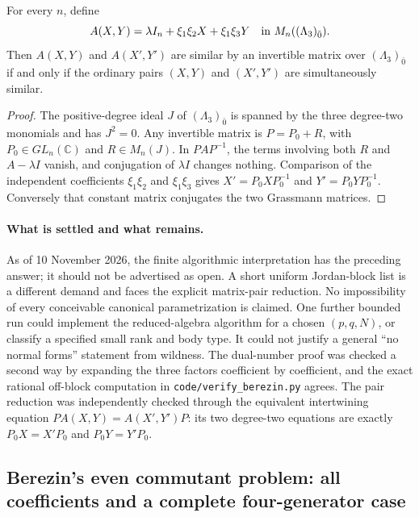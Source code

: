 \begin{proposition}
For every \(n\), define
\[
 A(X,Y)=\lambda I_n+\xi_1\xi_2X+\xi_1\xi_3Y
 \quad\hbox{in }M_n((\Lambda_3)_{\bar0}).
\]
Then \(A(X,Y)\) and \(A(X',Y')\) are similar by an invertible matrix over \((\Lambda_3)_{\bar0}\) if and only if the ordinary pairs \((X,Y)\) and \((X',Y')\) are simultaneously similar.
\end{proposition}
\begin{proof}
The positive-degree ideal \(J\) of \((\Lambda_3)_{\bar0}\) is spanned by the three degree-two monomials and has \(J^2=0\). Any invertible matrix is \(P=P_0+R\), with \(P_0\in GL_n(\mathbb C)\) and \(R\in M_n(J)\). In \(PAP^{-1}\), the terms involving both \(R\) and \(A-\lambda I\) vanish, and conjugation of \(\lambda I\) changes nothing. Comparison of the independent coefficients \(\xi_1\xi_2\) and \(\xi_1\xi_3\) gives \(X'=P_0XP_0^{-1}\) and \(Y'=P_0YP_0^{-1}\). Conversely that constant matrix conjugates the two Grassmann matrices.
\end{proof}

\paragraph{What is settled and what remains.}
As of 10 November 2026, the finite algorithmic interpretation has the preceding answer; it should not be advertised as open. A short uniform Jordan-block list is a different demand and faces the explicit matrix-pair reduction. No impossibility of every conceivable canonical parametrization is claimed. One further bounded run could implement the reduced-algebra algorithm for a chosen \((p,q,N)\), or classify a specified small rank and body type. It could not justify a general ``no normal forms'' statement from wildness. The dual-number proof was checked a second way by expanding the three factors coefficient by coefficient, and the exact rational off-block computation in \texttt{code/verify\_berezin.py} agrees. The pair reduction was independently checked through the equivalent intertwining equation \(PA(X,Y)=A(X',Y')P\): its two degree-two equations are exactly \(P_0X=X'P_0\) and \(P_0Y=Y'P_0\).

\subsection{Berezin's even commutant problem: all coefficients and a complete four-generator case}
\label{dev:berezin-commutant}

